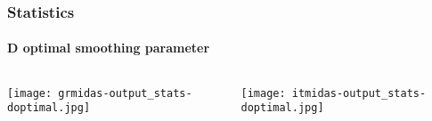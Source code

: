 \begin{frame}
  \frametitle{Statistics}
  \framesubtitle{D optimal smoothing parameter}
  \label{ch4:}
   
  \begin{columns}
    \begin{column}{0.5\textwidth}
      \begin{center}
        \texttt{[image: grmidas-output\_stats-doptimal.jpg]}   
      \end{center}
    \end{column}
    \begin{column}{0.5\textwidth}
      \begin{center}
        \texttt{[image: itmidas-output\_stats-doptimal.jpg]}     
      \end{center}
    \end{column}
  \end{columns}

\end{frame}
\note{}


